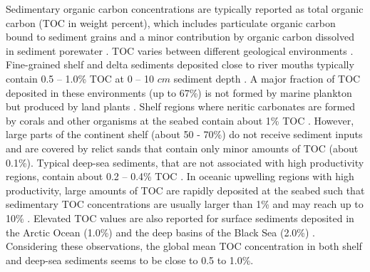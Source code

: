 \documentclass[journal abbreviation, manuscript]{copernicus}
\begin{document}
Sedimentary organic carbon concentrations are typically reported as total organic carbon (TOC in weight percent), which includes particulate organic carbon bound to sediment grains and a minor contribution by organic carbon dissolved in sediment porewater \citep{HEDGES199581}. TOC varies between different geological environments \citep{Emerson1988}. Fine-grained shelf and delta sediments deposited close to river mouths typically contain 0.5 – 1.0\% TOC at 0 – 10 $cm$ sediment depth \citep{Berner1982}. A major fraction of TOC deposited in these environments (up to 67\%) is not formed by marine plankton but produced by land plants \citep{Burdige2005}. Shelf regions where neritic carbonates are formed by corals and other organisms at the seabed contain about 1\% TOC \citep{Berner1982}. However, large parts of the continent shelf (about 50 - 70\%) do not receive sediment inputs and are covered by relict sands \citep{emery1968relict, Hall2002} that contain only minor amounts of TOC (about 0.1\%). Typical deep-sea sediments, that are not associated with high productivity regions, contain about 0.2 – 0.4\% TOC \citep{Baturin2007, Berner1982, LeeTOCkNN, SEITER20042001}. In oceanic upwelling regions with high productivity, large amounts of TOC are rapidly deposited at the seabed such that sedimentary TOC concentrations are usually larger than 1\% and may reach up to 10\% \citep{Berner1982, LeeTOCkNN, SEITER20042001}. Elevated TOC values are also reported for surface sediments deposited in the Arctic Ocean (1.0\%) and the deep basins of the Black Sea (2.0\%) \citep{Berner1982, LeeTOCkNN, SEITER20042001}. Considering these observations, the global mean TOC concentration in both shelf and deep-sea sediments seems to be close to 0.5 to 1.0\%.
\end{document}
